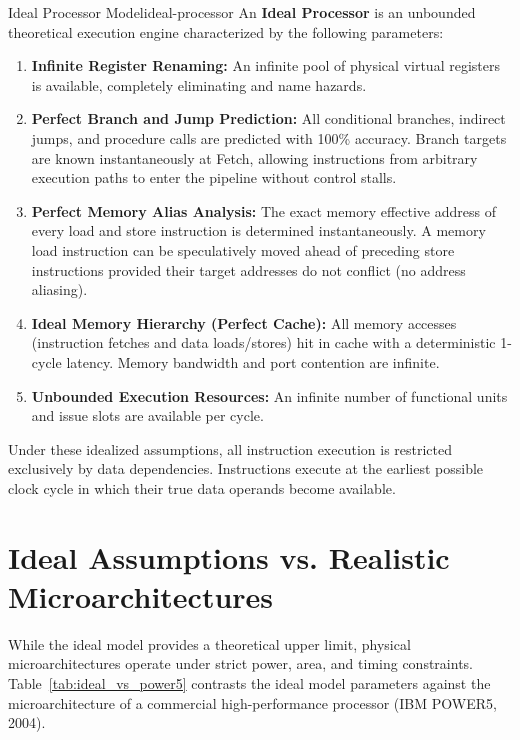 \begin{definition}{Ideal Processor Model}{ideal-processor}
An \textbf{Ideal Processor} is an unbounded theoretical execution engine characterized by the following parameters:
\begin{enumerate}
    \item \textbf{Infinite Register Renaming:} An infinite pool of physical virtual registers is available, completely eliminating  and  name hazards.
    \item \textbf{Perfect Branch and Jump Prediction:} All conditional branches, indirect jumps, and procedure calls are predicted with 100\% accuracy. Branch targets are known instantaneously at Fetch, allowing instructions from arbitrary execution paths to enter the pipeline without control stalls.
    \item \textbf{Perfect Memory Alias Analysis:} The exact memory effective address of every load and store instruction is determined instantaneously. A memory load instruction can be speculatively moved ahead of preceding store instructions provided their target addresses do not conflict (no address aliasing).
    \item \textbf{Ideal Memory Hierarchy (Perfect Cache):} All memory accesses (instruction fetches and data loads/stores) hit in cache with a deterministic 1-cycle latency. Memory bandwidth and port contention are infinite.
    \item \textbf{Unbounded Execution Resources:} An infinite number of functional units and issue slots are available per cycle.
\end{enumerate}
\end{definition}

Under these idealized assumptions, all instruction execution is restricted exclusively by  data dependencies. Instructions execute at the earliest possible clock cycle in which their true data operands become available.

\section{Ideal Assumptions vs. Realistic Microarchitectures}
\label{sec:ideal_vs_real}

While the ideal model provides a theoretical upper limit, physical microarchitectures operate under strict power, area, and timing constraints. Table~\ref{tab:ideal_vs_power5} contrasts the ideal model parameters against the microarchitecture of a commercial high-performance processor (IBM POWER5, 2004).

